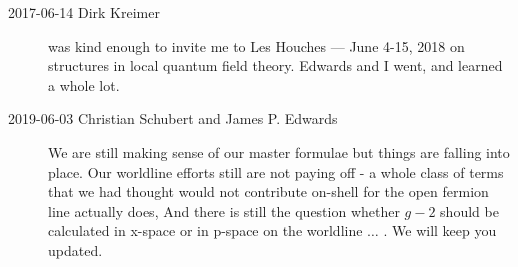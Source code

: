 \begin{description}
%

\item[2017-06-14 Dirk Kreimer] was kind enough to invite me to
{Les Houches — June 4-15, 2018} on structures in local quantum field
theory. Edwards and I went, and learned a whole lot.

\item[2019-06-03 Christian Schubert and James P. Edwards]
We are still making sense of our master formulae but things are falling
into place. Our worldline efforts still are not paying off - a whole
class of terms that we had thought would not contribute on-shell for the
open fermion line actually does, And there is still the question whether
$g-2$ should be calculated in x-space or in p-space on the worldline
$\dots$ . We will keep you updated.

\end{description}
